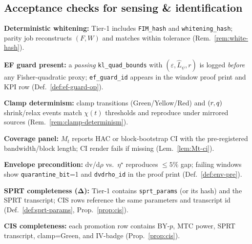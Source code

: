 \subsection{Acceptance checks for sensing \& identification}\label{subsec:sense-accept}
\begin{acceptchecks}
\item \textbf{Deterministic whitening:} Tier-1 includes \texttt{FIM\_hash} and \texttt{whitening\_hash}; parity job reconstructs $(F,W)$ and matches within tolerance (Rem.~\ref{rem:white-hash}).
\item \textbf{EF guard present:} a \emph{passing} \texttt{kl\_quad\_bounds} with $(\varepsilon,\hat L_\psi,r)$ is logged \emph{before} any Fisher-quadratic proxy; \texttt{ef\_guard\_id} appears in the window proof print and KPI row (Def.~\ref{def:ef-guard-op}).
\item \textbf{Clamp determinism:} clamp transitions (Green/Yellow/Red) and $(r,q)$ shrink/relax events match $\chi(t)$ thresholds and reproduce under mirrored sources (Rem.~\ref{rem:clamp-determinism}).
\item \textbf{Coverage panel:} $M_t$ reports HAC or block-bootstrap CI with the pre-registered bandwidth/block length; CI render fails if missing (Lem.~\ref{lem:Mt-ci}).
\item \textbf{Envelope precondition:} dv/d$\rho$ vs.\ $\eta^\star$ reproduces $\le 5\%$ gap; failing windows show \texttt{quarantine\_bit}=1 and \texttt{dvdrho\_id} in the proof print (Def.~\ref{def:env-pre}).
\item \textbf{SPRT completeness (Δ):} Tier-1 contains \texttt{sprt\_params} (or its hash) and the SPRT transcript; CIS rows reference the same parameters and transcript id (Def.~\ref{def:sprt-params}, Prop.~\ref{prop:cis}).
\item \textbf{CIS completeness:} each promotion row contains BY-$p$, MTC power, SPRT transcript, clamp=Green, and IV-badge (Prop.~\ref{prop:cis}).
\end{acceptchecks}

